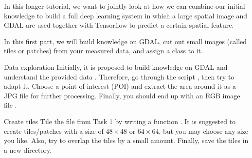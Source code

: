 \documentclass[twoside]{article}
\begin{document}
\maketitle

\vspace{10pt}

In this longer tutorial, we want to jointly look at how we can combine our initial knowledge to build a full deep learning system in which a large spatial image and GDAL are used together with Tensorflow to predict a certain spatial feature.

\vspace{10pt}

In this first part, we will build knowledge on GDAL, cut out small images (called tiles or patches) from your measured data, and assign a class to it.



\begin{task}{Data exploration}{}{}
Initially, it is proposed to build knowledge on GDAL and understand the provided data .
Therefore, go through the script , then try to adapt it.
Choose a point of interest (POI) and extract the area around it as a JPG file for further processing.
Finally, you should end up with an RGB image file .

\end{task}

\begin{task}{Create tiles}{}{}
Tile the file  from Task 1 by writing a function .
It is suggested to create tiles/patches with a size of $48 \times 48$ or $64 \times 64$, but you may choose any size you like.
Also, try to overlap the tiles by a small amount.
Finally, save the tiles in a new directory.

\end{task}
\end{document}
